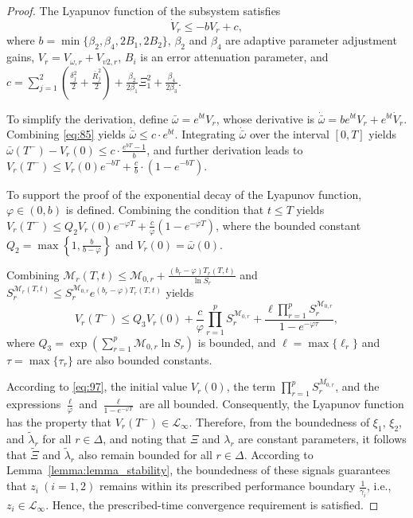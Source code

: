 \documentclass[]{interact}
\theoremstyle{plain}%
\theoremstyle{definition}
\theoremstyle{remark}
\begin{document}
\begin{proof}
The Lyapunov function of the subsystem satisfies
\begin{equation}
\label{eq:85}
\dot{V}_r \leq -bV_r + c,
\end{equation}
where \( b = \min\{\beta_2, \beta_4, 2B_1, 2B_2 \} \),
$\beta_2$ and $\beta_4$ are adaptive parameter adjustment gains, $V_r=V_{\omega,r}+V_{v2,r}$,
$B_i$ is an error attenuation parameter, 
and $c = \sum_{j=1}^2 \left( \frac{\delta_j^2}{2} + \frac{\bar{R}_j^2}{2} \right) + \frac{\beta_2}{2\beta_1}\Xi_1^2 + \frac{\beta_4}{2\beta_3}$.

To simplify the derivation, define \( \bar{\omega} = e^{bt}V_r \), whose derivative is $\dot{\bar{\omega}} = be^{bt}V_r + e^{bt}\dot{V}_r $. Combining \eqref{eq:85} yields $\dot{\bar{\omega}} \leq c \cdot e^{bt}$. Integrating \( \dot{\bar{\omega}} \) over the interval \([0,T]\) yields $\bar{\omega}(T^-) - V_r(0) \leq c\cdot\frac{e^{bT} - 1}{b}$, and further derivation leads to $V_r(T^-) \leq V_r(0)e^{-bT} + \frac{c}{b}\cdot(1 - e^{-bT}) $.

To support the proof of the exponential decay of the Lyapunov function, $\varphi \in (0, b)$ is defined. Combining the condition that $t \leq T$ yields $V_r(T^-) \leq Q_2 V_r(0) e^{-\varphi T} + \frac{c}{\varphi} \left( 1 - e^{-\varphi T} \right)$, where the bounded constant \(Q_2 = \max\left\{ 1, \frac{b}{b - \varphi} \right\}\) and \(V_r(0) = \bar{\omega}(0)\).

Combining $\mathcal{M}_r(T, t) \leq \mathcal{M}_{0, r} + \frac{(b_r - \varphi)T_r(T, t)}{\ln S_r}$ and $S_r^{\mathcal{M}_r(T, t)} \leq S_r^{\mathcal{M}_{0, r}} e^{(b_r - \varphi)T_r(T, t)}$\citep{Yk2024,Hs2024} yields
\begin{equation}
\label{eq:97}
V_r(T^-) \leq Q_3 V_r(0) + \frac{c}{\varphi} \prod_{r=1}^p S_r^{\mathcal{M}_{0, r}} + \frac{\ell \prod_{r=1}^p S_r^{\mathcal{M}_{0, r}}}{1 - e^{-\varphi \tau}},
\end{equation}
where $Q_3 = \exp\left( \sum_{r=1}^p \mathcal{M}_{0, r} \ln S_r \right)$ is  bounded,  
and 
$\ell = \max\{\ell_r\}$ and $\tau = \max\{\tau_r\}$ are also bounded constants.   

According to \eqref{eq:97}, the initial value $V_r(0)$, the term $\prod_{r=1}^{p} S_{r}^{M_{0,r}}$, and the expressions $\frac{\ell}{\varphi}$ and $\frac{\ell}{1 - e^{-\varphi T}}$ are all bounded. Consequently, the Lyapunov function has the property that $V_r(T^{-}) \in \mathcal{L}_{\infty}$. Therefore, from the boundedness of $\xi_1$, $\xi_2$, and $\tilde{\lambda}_r$ for all $r \in \Delta$, and noting that $\Xi$ and $\lambda_r$ are constant parameters, it follows that $\tilde{\Xi}$ and $\tilde{\lambda}_r$ also remain bounded for all $r \in \Delta$. According to Lemma~\ref{lemma:lemma_stability}, the boundedness of these signals guarantees that $z_i\ (i = 1,2)$ remains within its prescribed performance boundary $\frac{1}{\gamma_i}$, i.e., $z_i \in \mathcal{L}_{\infty}$. 
Hence, the prescribed-time convergence requirement is satisfied.


\end{proof}
\end{document}
